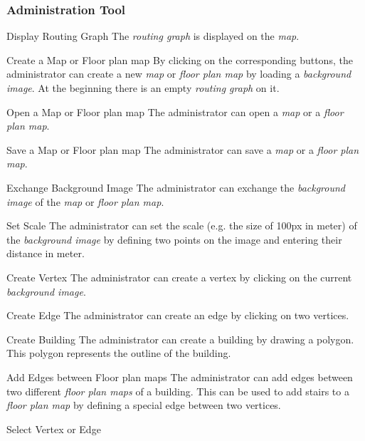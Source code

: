 \subsubsection{Administration Tool}

\begin{numerate}[FMA]
\item[Display Routing Graph]
The \textit{routing graph} is displayed on the \textit{map}.
	\item[Create a Map or Floor plan map]
		By clicking on the corresponding buttons, the administrator can create a new \textit{map} or \textit{floor plan map} by loading a \textit{background image}. At the beginning there is an empty \textit{routing graph} on it.
		\item[Open a Map or Floor plan map]
		The administrator can open a \textit{map} or a \textit{floor plan map}.
		\item[Save a Map or Floor plan map]
		The administrator can save a \textit{map} or a \textit{floor plan map}.
	\item[Exchange Background Image] The administrator can exchange the \textit{background image} of the \textit{map} or \textit{floor plan map}.
	\item[Set Scale] The administrator can set the scale (e.g. the size of 100px in meter) of the \textit{background image} by defining two points on the image and entering their distance in meter.
	\item[Create Vertex] The administrator can create a vertex by clicking on the current \textit{background image}.
	\item[Create Edge] The administrator can create an edge by clicking on two vertices.
	\item[Create Building] The administrator can create a building by drawing a polygon. This polygon represents the outline of the building.
	\item[Add Edges between Floor plan maps] The administrator can add edges between two different \textit{floor plan maps} of a building. This can be used to add stairs to a \textit{floor plan map} by defining a special edge between two vertices.
		\item[Select Vertex or Edge]

\end{numerate}

